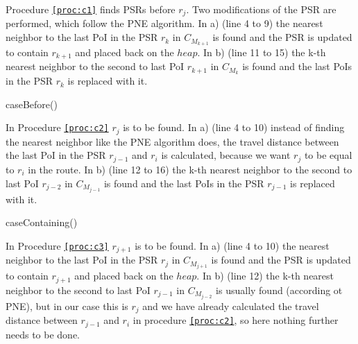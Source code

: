 Procedure \texttt{\ref{proc:c1}} finds PSRs before $r_j$. Two modifications of the PSR are performed, which follow the PNE algorithm. In a) (line 4 to 9) the nearest neighbor to the last PoI in the PSR $r_k$ in $C_{M_{k+1}}$ is found and the PSR is updated to contain $r_{k+1}$ and placed back on the $heap$. In b) (line 11 to 15) the k-th nearest neighbor to the second to last PoI $r_{k+1}$ in $C_{M_{k}}$ is found and the last PoIs in the PSR $r_k$ is replaced with it. \newline

\raggedbottom

\begin{procedure}[H]
\caption{caseBefore()}
\label{proc:c1}
	
\end{procedure}

In Procedure \texttt{\ref{proc:c2}} $r_j$ is to be found. In a) (line 4 to 10) instead of finding the nearest neighbor like the PNE algorithm does, the travel distance between the last PoI in the PSR $r_{j-1}$ and $r_i$ is calculated, because we want $r_j$ to be equal to $r_i$ in the route. In b) (line 12 to 16) the k-th nearest neighbor to the second to last PoI $r_{j-2}$ in $C_{M_{j-1}}$ is found and the last PoIs in the PSR $r_{j-1}$ is replaced with it.

\begin{procedure}[H]
\caption{caseContaining()}
\label{proc:c2}
	
\end{procedure}

\vspace{\baselineskip}

In Procedure \texttt{\ref{proc:c3}} $r_{j+1}$ is to be found. In a) (line 4 to 10) the nearest neighbor to the last PoI in the PSR $r_j$ in $C_{M_{j+1}}$ is found and the PSR is updated to contain $r_{j+1}$ and placed back on the $heap$. In b) (line 12) the k-th nearest neighbor to the second to last PoI $r_{j-1}$ in $C_{M_{j-2}}$ is usually found (according ot PNE), but in our case this is $r_j$ and we have already calculated the travel distance between $r_{j-1}$ and $r_i$ in procedure \texttt{\ref{proc:c2}}, so here nothing further needs to be done.

